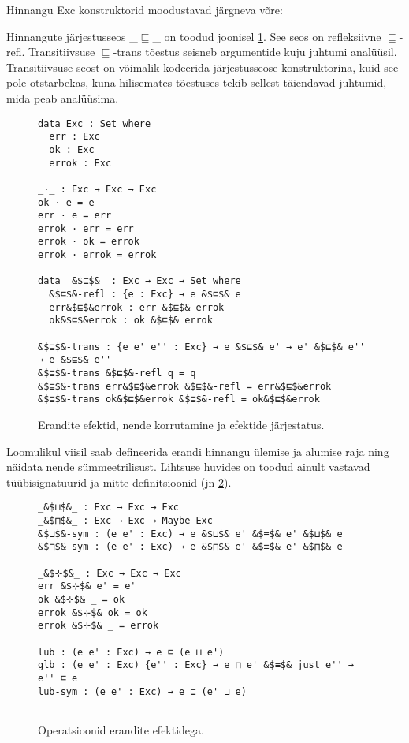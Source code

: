 \documentclass[a4paper,12pt]{article}
\begin{document}
Hinnangu Exc konstruktorid moodustavad järgneva võre:
\begin{center}
\end{center}
Hinnangute järjestusseos _$⊑$_ on toodud joonisel \ref{fig:exc.exc}. See seos on refleksiivne $⊑$-refl. Transitiivsuse $⊑$-trans tõestus seisneb argumentide kuju juhtumi analüüsil. Transitiivsuse seost on võimalik kodeerida järjestusseose konstruktorina, kuid see pole otstarbekas, kuna hilisemates tõestuses tekib sellest täiendavad juhtumid, mida peab analüüsima.
\begin{figure}
  \begin{lstlisting}
data Exc : Set where
  err : Exc
  ok : Exc
  errok : Exc
  
_·_ : Exc → Exc → Exc
ok · e = e
err · e = err
errok · err = err
errok · ok = errok
errok · errok = errok

data _&$⊑$&_ : Exc → Exc → Set where
  &$⊑$&-refl : {e : Exc} → e &$⊑$& e
  err&$⊑$&errok : err &$⊑$& errok
  ok&$⊑$&errok : ok &$⊑$& errok
  
&$⊑$&-trans : {e e' e'' : Exc} → e &$⊑$& e' → e' &$⊑$& e'' → e &$⊑$& e''
&$⊑$&-trans &$⊑$&-refl q = q
&$⊑$&-trans err&$⊑$&errok &$⊑$&-refl = err&$⊑$&errok
&$⊑$&-trans ok&$⊑$&errok &$⊑$&-refl = ok&$⊑$&errok
  \end{lstlisting}
  \caption{Erandite efektid, nende korrutamine ja efektide järjestatus.}
  \label{fig:exc.exc}
\end{figure}

Loomulikul viisil saab defineerida erandi hinnangu ülemise ja alumise raja ning näidata nende sümmeetrilisust.
Lihtsuse huvides on toodud ainult vastavad tüübisignatuurid ja mitte definitsioonid (jn \ref{fig:exc.ops}).
\begin{figure}
  \begin{lstlisting}
_&$⊔$&_ : Exc → Exc → Exc
_&$⊓$&_ : Exc → Exc → Maybe Exc
&$⊔$&-sym : (e e' : Exc) → e &$⊔$& e' &$≡$& e' &$⊔$& e
&$⊓$&-sym : (e e' : Exc) → e &$⊓$& e' &$≡$& e' &$⊓$& e

_&$⊹$&_ : Exc → Exc → Exc
err &$⊹$& e' = e'
ok &$⊹$& _ = ok
errok &$⊹$& ok = ok
errok &$⊹$& _ = errok
    
lub : (e e' : Exc) → e ⊑ (e ⊔ e')
glb : (e e' : Exc) {e'' : Exc} → e ⊓ e' &$≡$& just e'' → e'' ⊑ e
lub-sym : (e e' : Exc) → e ⊑ (e' ⊔ e)
    
  \end{lstlisting}
  \caption{Operatsioonid erandite efektidega.}
  \label{fig:exc.ops}
\end{figure}
\end{document}
